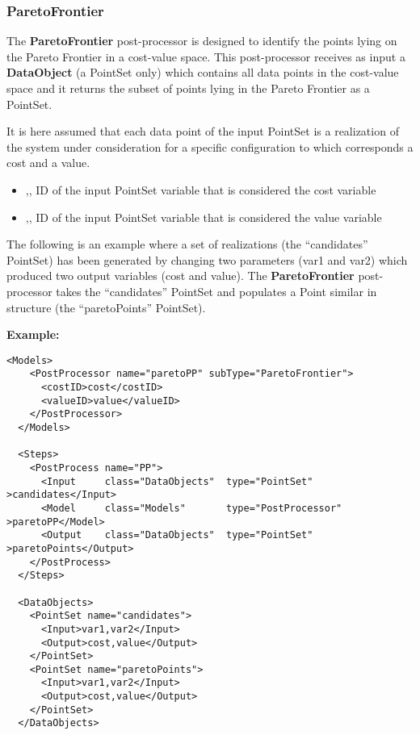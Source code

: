 
\subsubsection{ParetoFrontier}
\label{ParetoFrontierPP}
The \textbf{ParetoFrontier} post-processor is designed to identify the points lying on the Pareto Frontier in a cost-value space.
This post-processor receives as input a \textbf{DataObject} (a PointSet only) which contains all data points in the cost-value space and it 
returns the subset of points lying in the Pareto Frontier as a PointSet.

It is here assumed that each data point of the input PointSet is a realization of the system under consideration for a 
specific configuration to which corresponds a cost and a value.

%
%
\begin{itemize}
  \item  {},, ID of the input PointSet variable that is considered the cost variable 
  \item  {},, ID of the input PointSet variable that is considered the value variable
\end{itemize}

The following is an example where a set of realizations (the ``candidates'' PointSet) has been generated by changing two parameters 
(var1 and var2) which produced two output variables (cost and value).
The \textbf{ParetoFrontier} post-processor takes the ``candidates'' PointSet and populates a Point similar in structure 
(the ``paretoPoints'' PointSet).

\textbf{Example:}
\begin{lstlisting}[style=XML,morekeywords={anAttribute},caption=ParetoFrontier input example (no expand)., label=lst:ParetoFrontier_PP_InputExample]
  <Models>
    <PostProcessor name="paretoPP" subType="ParetoFrontier">
      <costID>cost</costID>
      <valueID>value</valueID>
    </PostProcessor>   
  </Models>

  <Steps>
    <PostProcess name="PP">
      <Input     class="DataObjects"  type="PointSet"        >candidates</Input>
      <Model     class="Models"       type="PostProcessor"   >paretoPP</Model>
      <Output    class="DataObjects"  type="PointSet"        >paretoPoints</Output>
    </PostProcess>
  </Steps>
  
  <DataObjects>
    <PointSet name="candidates">
      <Input>var1,var2</Input>
      <Output>cost,value</Output>
    </PointSet>
    <PointSet name="paretoPoints">
      <Input>var1,var2</Input>
      <Output>cost,value</Output>
    </PointSet>
  </DataObjects>
\end{lstlisting}

